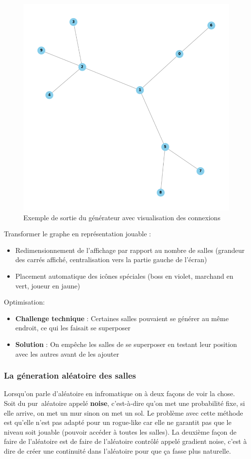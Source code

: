 \documentclass[a4paper,11pt]{article}
\begin{document}
\begin{figure}[ht]
\centering
\includegraphics[width=0.4\linewidth]{./img/map_generation.png}
\caption{Exemple de sortie du générateur avec visualisation des connexions}
\label{fig:map_gen32}
\end{figure}
\bigskip
Transformer le graphe en représentation jouable :
\begin{itemize}
    \item Redimensionnement de l'affichage par rapport  au nombre de salles (grandeur des carrés affiché, centralisation vers la partie gauche de l'écran)
    \item  Placement automatique des icônes spéciales (boss en violet, marchand en vert, joueur en jaune)
\end{itemize}
\bigskip
Optimisation:
\begin{itemize}
\item \textbf{Challenge technique} : Certaines salles pouvaient se générer au même endroit, ce qui les faisait se superposer
\item \textbf{Solution} : On empêche les salles de se superposer en testant leur position avec les autres avant de les ajouter
\end{itemize}


\subsubsection{La géneration aléatoire des salles}
Lorsqu'on parle d'aléatoire en infromatique on à deux façons de voir la chose. Soit du \guillemotleft pur\guillemotright \ aléatoire appelé \textbf{noise}, c'est-à-dire qu'on met une probabilité fixe, si elle arrive, on met un mur sinon on met un sol. Le problème avec cette méthode est qu'elle n'est pas adapté pour un rogue-like car elle ne garantit pas que le niveau soit jouable (pouvoir accéder à toutes les salles). 
La deuxième façon de faire de l'aléatoire est de faire de l'aléatoire contrôlé appelé gradient noise, c'est à dire de créer une continuité dans l'aléatoire pour que ça fasse plus naturelle.\\\\
\end{document}
